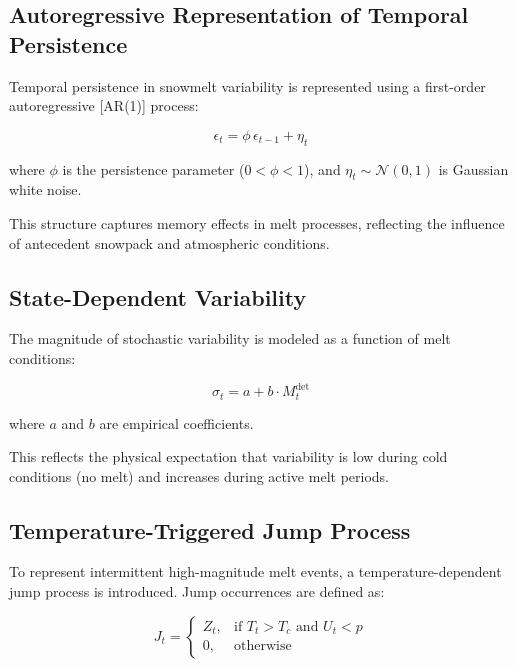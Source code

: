 \documentclass[11pt]{article}
\begin{document}
	\subsection{Autoregressive Representation of Temporal Persistence}
	
	Temporal persistence in snowmelt variability is represented using a first-order autoregressive [AR(1)] process:
	
	\begin{equation}
		\epsilon_t = \phi \, \epsilon_{t-1} + \eta_t
	\end{equation}
	
	where $\phi$ is the persistence parameter ($0 < \phi < 1$), and $\eta_t \sim \mathcal{N}(0,1)$ is Gaussian white noise.
	
	This structure captures memory effects in melt processes, reflecting the influence of antecedent snowpack and atmospheric conditions.
	
	\subsection{State-Dependent Variability}
	
	The magnitude of stochastic variability is modeled as a function of melt conditions:
	
	\begin{equation}
		\sigma_t = a + b \cdot M_t^{\mathrm{det}}
	\end{equation}
	
	where $a$ and $b$ are empirical coefficients.
	
	This reflects the physical expectation that variability is low during cold conditions (no melt) and increases during active melt periods.
	
	\subsection{Temperature-Triggered Jump Process}
	
	To represent intermittent high-magnitude melt events, a temperature-dependent jump process is introduced. Jump occurrences are defined as:
	
	\begin{equation}
		J_t =
		\begin{cases}
			Z_t, & \text{if } T_t > T_c \text{ and } U_t < p \\
			0, & \text{otherwise}
		\end{cases}
	\end{equation}
	
\end{document}
